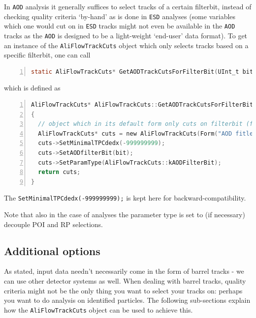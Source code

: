 \documentclass[a4paper]{book}
\numberwithin{equation}{subsection}
\begin{document}
In \texttt{AOD} analysis it generally suffices to select tracks of a certain filterbit, instead of checking quality criteria `by-hand' as is done in \texttt{ESD} analyses (some variables which one would cut on in \texttt{ESD} tracks might not even be available in the \texttt{AOD} tracks as the \texttt{AOD} is designed to be a light-weight `end-user' data format). To get an instance of the \texttt{AliFlowTrackCuts} object which only selects tracks based on a specific filterbit, one can call
\begin{lstlisting}[language=C, numbers=left]
 static AliFlowTrackCuts* GetAODTrackCutsForFilterBit(UInt_t bit = 1);\end{lstlisting}
 which is defined as
 \begin{lstlisting}[language=C, numbers=left]
 AliFlowTrackCuts* AliFlowTrackCuts::GetAODTrackCutsForFilterBit(UInt_t bit)
{
  // object which in its default form only cuts on filterbit (for AOD analysis)
  AliFlowTrackCuts* cuts = new AliFlowTrackCuts(Form("AOD fitlerbit %i", (int)bit));
  cuts->SetMinimalTPCdedx(-999999999);
  cuts->SetAODfilterBit(bit);
  cuts->SetParamType(AliFlowTrackCuts::kAODFilterBit);
  return cuts;
}  \end{lstlisting}
The \texttt{SetMinimalTPCdedx(-999999999);} is kept here for backward-compatibility. 

Note that also in the case of  analyses the parameter type is set to (if necessary) decouple POI and RP selections. 

\subsection{Additional options}
As stated, input data needn't necessarily come in the form of barrel tracks - we can use other detector systems as well. When dealing with barrel tracks, quality criteria might not be the only thing you want to select your tracks on: perhaps you want to do analysis on identified particles. The following sub-sections explain how the \texttt{AliFlowTrackCuts} object can be used to achieve this. 
\end{document}
